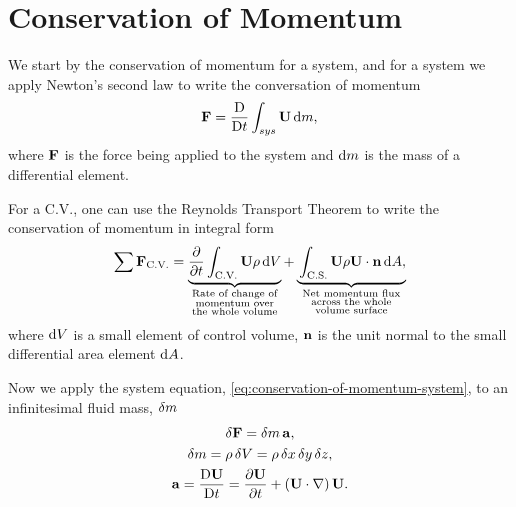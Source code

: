 \section{Conservation of Momentum}

We start by the conservation of momentum for a system, and for a system we apply Newton's second law to write the conversation of momentum
%
\begin{equation}
	\mathbf{F} = \frac{\mathop{}\!\mathrm{D} }{\mathop{}\!\mathrm{D} t} \int_{sys}{\mathbf{U} \mathop{}\!\mathrm{d} m},
	\label{eq:conservation-of-momentum-system}
\end{equation}
%
where \(\mathbf{F}\) is the force being applied to the system and \(\mathop{}\!\mathrm{d} m\) is the mass of a differential element.

For a C.V., one can use the Reynolds Transport Theorem to write the conservation of momentum in integral form
%
\begin{equation}
	\sum{\mb{F}_{\text{C.V.}}}
	=
  \underbrace{\vphantom{\f{\p}{\rho}}\f{\p }{\p t} \int_{\text{C.V.}}{\mb{U} \rho \d V}}_{\mathclap{\substack{\text{Rate of change of}\\\text{momentum over} \\ \text{the whole volume}}}}
  + \underbrace{\vphantom{\f{\p}{\rho}}\int_{\text{C.S.}}{\mb{U} \rho \mb{U} \cdot \mb{n} \d A,}}_{\mathclap{\substack{\text{Net momentum flux}\\\text{across the whole} \\ \text{volume surface}}}}
	\label{eq:conservation-of-momentum-integral-form}
\end{equation}
%
where \(\mathop{}\!\mathrm{d} V\) is a small element of control volume, \(\mathbf{n}\) is the unit normal to the small differential area element \(\mathop{}\!\mathrm{d} A\).

Now we apply the system equation, \cref{eq:conservation-of-momentum-system}, to an infinitesimal fluid mass, \(\mathop{}\!\delta m\)
%
\begin{equation}
	\begin{gathered}
		\deltaop \mb{F} = \deltaop m\, \mb{a}, \\
		\deltaop m = \rho \deltaop V = \rho \deltaop x \deltaop y \deltaop z, \\
    \mb{a} = \f{\D \U}{\D t} = \f{\p \U}{\p t} + \left( \U \cdot \grad \right) \U.
	\end{gathered}
	\label{eq:equation-of-motion-for-dm}
\end{equation}


